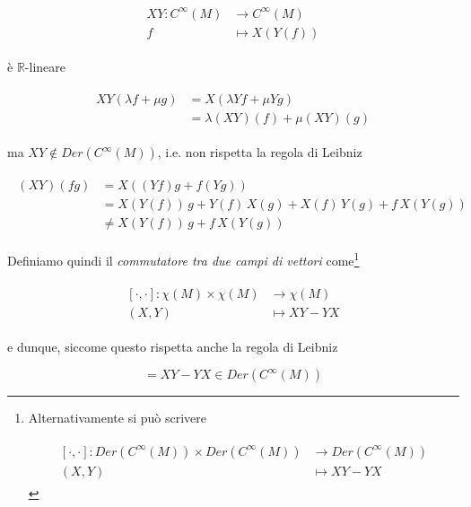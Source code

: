 \begin{align}
	\begin{split}
		X Y : C^{\infty}(M) &\to C^{\infty}(M)\\
		f &\mapsto X(Y(f))
	\end{split}
\end{align}

è $ \mathbb{R} $-lineare

\begin{align}
	\begin{split}
		X Y (\lambda f + \mu g) &= X (\lambda Y f + \mu Y g)\\
		&= \lambda (XY)(f) + \mu (XY)(g)
	\end{split}
\end{align}

ma $ XY \notin Der(C^{\infty}(M)) $, i.e. non rispetta la regola di Leibniz

\begin{align}
	\begin{split}
		(XY)(fg) &= X ((Yf) g + f (Y g))\\
		&= X(Y(f)) \, g + Y(f) \, X(g) + X(f) \, Y(g) + f \, X(Y(g))\\
		&\neq X(Y(f)) \, g + f \, X(Y(g))
	\end{split}
\end{align}

Definiamo quindi il \textit{commutatore tra due campi di vettori} come\footnote{%
	Alternativamente si può scrivere

	\begin{align}
		\begin{split}
			[\cdot,\cdot] : Der(C^{\infty}(M)) \times Der(C^{\infty}(M)) &\to Der(C^{\infty}(M))\\
			(X,Y) &\mapsto XY-YX
		\end{split}
	\end{align}%
}

\begin{align}
	\begin{split}
		[\cdot,\cdot] : \chi(M) \times \chi(M) &\to \chi(M)\\
		(X,Y) &\mapsto XY-YX
	\end{split}
\end{align}

e dunque, siccome questo rispetta anche la regola di Leibniz

\begin{equation}
	[X,Y] = XY-YX \in Der(C^{\infty}(M))
\end{equation}

